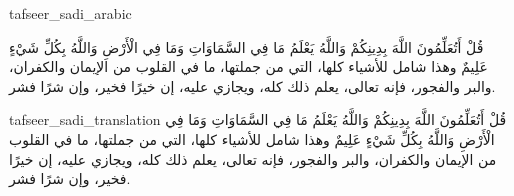 \begin{taggedblock}{tafseer_sadi_arabic}
\begin{Arabic}
{ قُلْ أَتُعَلِّمُونَ اللَّهَ بِدِينِكُمْ وَاللَّهُ يَعْلَمُ مَا فِي السَّمَاوَاتِ وَمَا فِي الْأَرْضِ وَاللَّهُ بِكُلِّ شَيْءٍ عَلِيمٌ }
وهذا شامل للأشياء كلها، التي من جملتها، ما في القلوب من الإيمان والكفران، والبر والفجور، فإنه تعالى، يعلم ذلك كله، ويجازي عليه، إن خيرًا فخير، وإن شرًا فشر.
\end{Arabic}
\end{taggedblock}
\begin{taggedblock}{tafseer_sadi_translation}
{ قُلْ أَتُعَلِّمُونَ اللَّهَ بِدِينِكُمْ وَاللَّهُ يَعْلَمُ مَا فِي السَّمَاوَاتِ وَمَا فِي الْأَرْضِ وَاللَّهُ بِكُلِّ شَيْءٍ عَلِيمٌ }
وهذا شامل للأشياء كلها، التي من جملتها، ما في القلوب من الإيمان والكفران، والبر والفجور، فإنه تعالى، يعلم ذلك كله، ويجازي عليه، إن خيرًا فخير، وإن شرًا فشر.
\end{taggedblock}

\begin{comment}
Please use the following for footnotes:- Sample\footnoteQ{Text of Qur'an footnote goes here.}.
Sample\footnoteT{Text of Tafseer footnote goes here.}.
\end{comment}